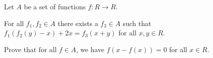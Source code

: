 Let $A$ be a set of functions $f : R\to R$.

For all $f_1, f_2 \in A$ there exists a $f_3 \in A$ such that $f_1(f_2(y) - x)+ 2x = f_3(x + y)$ for all $x, y \in R$.

Prove that for all $f \in A$,  we have $f(x - f(x))= 0$ for all $x \in R$.